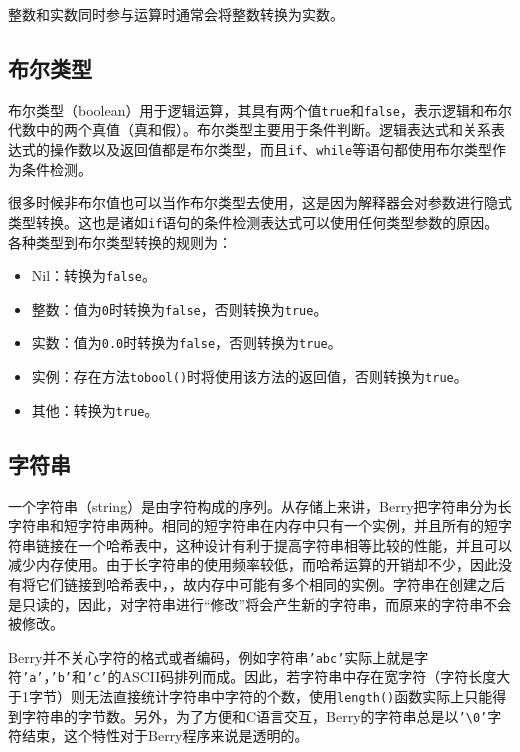整数和实数同时参与运算时通常会将整数转换为实数。

\subsection{布尔类型} \label{section:type_bool}

布尔类型（boolean）用于逻辑运算，其具有两个值\texttt{true}和\texttt{false}，表示逻辑和布尔代数中的两个真值（真和假）。布尔类型主要用于条件判断。逻辑表达式和关系表达式的操作数以及返回值都是布尔类型，而且\texttt{if}、\texttt{while}等语句都使用布尔类型作为条件检测。

很多时候非布尔值也可以当作布尔类型去使用，这是因为解释器会对参数进行隐式类型转换。这也是诸如\texttt{if}语句的条件检测表达式可以使用任何类型参数的原因。各种类型到布尔类型转换的规则为：
\begin{itemize}
    \item Nil：转换为\texttt{false}。
    \item 整数：值为\texttt{0}时转换为\texttt{false}，否则转换为\texttt{true}。
    \item 实数：值为\texttt{0.0}时转换为\texttt{false}，否则转换为\texttt{true}。
    \item 实例：存在方法\texttt{tobool()}时将使用该方法的返回值，否则转换为\texttt{true}。
    \item 其他：转换为\texttt{true}。
\end{itemize}

\subsection{字符串}

一个字符串（string）是由字符构成的序列。从存储上来讲，Berry把字符串分为长字符串和短字符串两种。相同的短字符串在内存中只有一个实例，并且所有的短字符串链接在一个哈希表中，这种设计有利于提高字符串相等比较的性能，并且可以减少内存使用。由于长字符串的使用频率较低，而哈希运算的开销却不少，因此没有将它们链接到哈希表中，，故内存中可能有多个相同的实例。字符串在创建之后是只读的，因此，对字符串进行``修改''将会产生新的字符串，而原来的字符串不会被修改。

Berry并不关心字符的格式或者编码，例如字符串\texttt{'abc'}实际上就是字符\texttt{'a'}，\texttt{'b'}和\texttt{'c'}的ASCII码排列而成。因此，若字符串中存在宽字符（字符长度大于1字节）则无法直接统计字符串中字符的个数，使用\texttt{length()}函数实际上只能得到字符串的字节数。另外，为了方便和C语言交互，Berry的字符串总是以\texttt{'\textbackslash 0'}字符结束，这个特性对于Berry程序来说是透明的。

